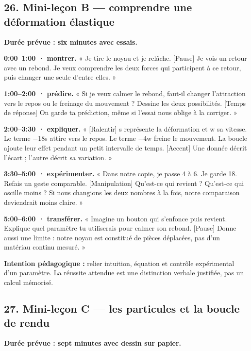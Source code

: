 \documentclass[
  canadien,
  11pt,
  letterpaper,
]{article}
\begin{document}
\subsection{26. Mini-leçon B --- comprendre une déformation
élastique}\label{mini-leuxe7on-b-comprendre-une-duxe9formation-uxe9lastique}

\textbf{Durée prévue : six minutes avec essais.}

\textbf{0:00--1:00 · montrer.} « Je tire le noyau et je relâche.
{[}Pause{]} Je vois un retour avec un rebond. Je veux comprendre les
deux forces qui participent à ce retour, puis changer une seule d'entre
elles. »

\textbf{1:00--2:00 · prédire.} « Si je veux calmer le rebond, faut-il
changer l'attraction vers le repos ou le freinage du mouvement ? Dessine
les deux possibilités. {[}Temps de réponse{]} On garde ta prédiction,
même si l'essai nous oblige à la corriger. »

\textbf{2:00--3:30 · expliquer.} « {[}Ralentir{]} s représente la
déformation et w sa vitesse. Le terme −18s attire vers le repos. Le
terme −4w freine le mouvement. La boucle ajoute leur effet pendant un
petit intervalle de temps. {[}Accent{]} Une donnée décrit l'écart ;
l'autre décrit sa variation. »

\textbf{3:30--5:00 · expérimenter.} « Dans notre copie, je passe 4 à 6.
Je garde 18. Refais un geste comparable. {[}Manipulation{]} Qu'est-ce
qui revient ? Qu'est-ce qui oscille moins ? Si nous changions les deux
nombres à la fois, notre comparaison deviendrait moins claire. »

\textbf{5:00--6:00 · transférer.} « Imagine un bouton qui s'enfonce puis
revient. Explique quel paramètre tu utiliserais pour calmer son rebond.
{[}Pause{]} Donne aussi une limite : notre noyau est constitué de pièces
déplacées, pas d'un matériau continu mesuré. »

\textbf{Intention pédagogique :} relier intuition, équation et contrôle
expérimental d'un paramètre. La réussite attendue est une distinction
verbale justifiée, pas un calcul mémorisé.

\subsection{27. Mini-leçon C --- les particules et la boucle de
rendu}\label{mini-leuxe7on-c-les-particules-et-la-boucle-de-rendu}

\textbf{Durée prévue : sept minutes avec dessin sur papier.}
\end{document}
